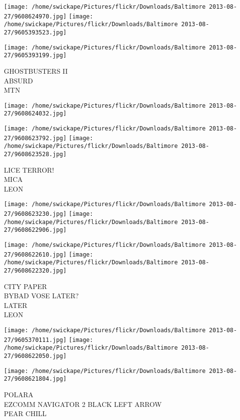 \documentclass[10pt,letterpaper]{article}
\begin{document}
\texttt{[image: /home/swickape/Pictures/flickr/Downloads/Baltimore 2013-08-27/9608624970.jpg]}
\texttt{[image: /home/swickape/Pictures/flickr/Downloads/Baltimore 2013-08-27/9605393523.jpg]}

\texttt{[image: /home/swickape/Pictures/flickr/Downloads/Baltimore 2013-08-27/9605393199.jpg]}

GHOSTBUSTERS II\\
ABSURD\\
MTN\\
\pagebreak

\texttt{[image: /home/swickape/Pictures/flickr/Downloads/Baltimore 2013-08-27/9608624032.jpg]}

\vspace{0.25in}
\texttt{[image: /home/swickape/Pictures/flickr/Downloads/Baltimore 2013-08-27/9608623792.jpg]}
\texttt{[image: /home/swickape/Pictures/flickr/Downloads/Baltimore 2013-08-27/9608623528.jpg]}

LICE TERROR!\\
MICA\\
LEON\\
\pagebreak

\texttt{[image: /home/swickape/Pictures/flickr/Downloads/Baltimore 2013-08-27/9608623230.jpg]}
\texttt{[image: /home/swickape/Pictures/flickr/Downloads/Baltimore 2013-08-27/9608622906.jpg]}

\texttt{[image: /home/swickape/Pictures/flickr/Downloads/Baltimore 2013-08-27/9608622610.jpg]}
\texttt{[image: /home/swickape/Pictures/flickr/Downloads/Baltimore 2013-08-27/9608622320.jpg]}

CITY PAPER\\
BYBAD VOSE LATER?\\
LATER\\
LEON\\
\pagebreak

\texttt{[image: /home/swickape/Pictures/flickr/Downloads/Baltimore 2013-08-27/9605370111.jpg]}
\texttt{[image: /home/swickape/Pictures/flickr/Downloads/Baltimore 2013-08-27/9608622050.jpg]}

\vspace{0.25in}
\texttt{[image: /home/swickape/Pictures/flickr/Downloads/Baltimore 2013-08-27/9608621804.jpg]}

POLARA\\
EZCOMM NAVIGATOR 2 BLACK LEFT ARROW\\
PEAR CHILL\\
\pagebreak
\end{document}
